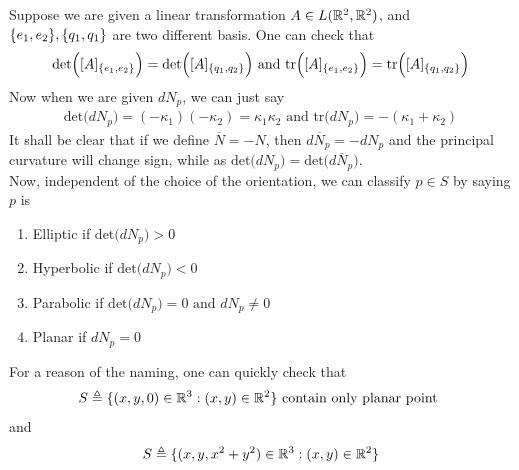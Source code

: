 \documentclass{report}
\begin{document}
\begin{mdframed}
Suppose we are given a linear transformation $A\in L(\mathbb{R}^2,\mathbb{R}^2)$, and $\{ e_1,e_2 \},\{ q_1,q_1 \}$ are two different basis. One can check that 
\begin{align*}
  \text{det}\Big([A]_{\{ e_1,e_2 \}} \Big)=\text{det}\Big([A]_{\{ q_1,q_2 \}} \Big)\text{ and }\text{tr}\Big([A]_{\{ e_1,e_2 \}} \Big)=\text{tr}\Big([A]_{\{ q_1,q_2 \}} \Big)
\end{align*}
Now when we are given $dN_p$, we can just say 
 \begin{align*}
\text{det}\Big(dN_p \Big)=(-\kappa_1)(-\kappa_2)=\kappa_1\kappa_2\text{ and }\text{tr}\Big(dN_p \Big)=-(\kappa_1+\kappa_2)
\end{align*}
It shall be clear that if we define $\overline{N}=-N$, then $d\overline{N}_p=-dN_p$ and the principal curvature will change sign, while as $\text{det}\Big(dN_p \Big)=\text{det}\Big(d\overline{N}_p \Big)$.\\

Now, independent of the choice of the orientation, we can classify $p\in  S$ by saying $p$ is 
\begin{enumerate}[label=(\alph*)]
  \item Elliptic if $\text{det}\Big(dN_p \Big)>0$ 
  \item Hyperbolic if $\text{det}\Big(dN_p \Big)<0$ 
  \item Parabolic if $\text{det}\Big(dN_p \Big)=0\text{ and }dN_p\neq 0$ 
  \item Planar if $dN_p=0$
\end{enumerate}
\end{mdframed}
\begin{mdframed}
For a reason of the naming, one can quickly check that 
\begin{align*}
S\triangleq \{ (x,y,0)\in\mathbb{R}^3:(x,y)\in\mathbb{R}^2 \}\text{ contain only planar point }
\end{align*}
and 
\begin{align*}
S\triangleq \{ (x,y,x^2+y^2)\in\mathbb{R}^3:(x,y)\in\mathbb{R}^2 \}
\end{align*}

\end{mdframed}
\end{document}
